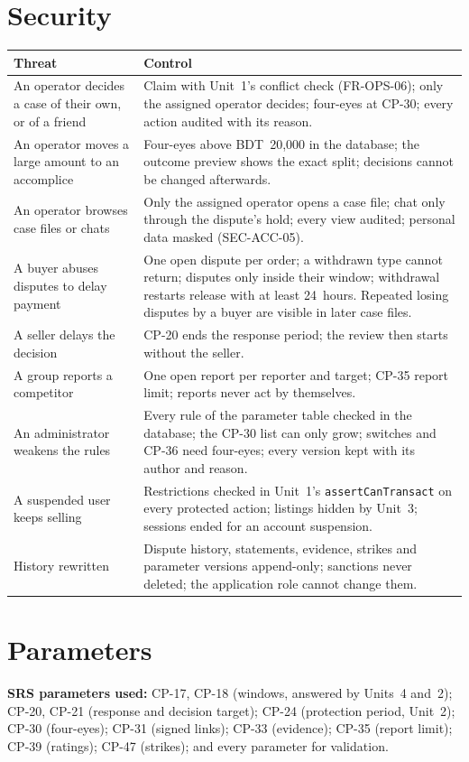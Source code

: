 \documentclass[11pt,a4paper]{article}
\newenvironment{dtable}[1]{\small\begin{longtable}{#1}}{\end{longtable}}
\begin{document}
\section{Security}
\begin{dtable}{@{}>{\raggedright\arraybackslash}p{4.6cm}>{\raggedright\arraybackslash}p{10.6cm}@{}}
\toprule
\textbf{Threat} & \textbf{Control} \\ \midrule \endhead
An operator decides a case of their own, or of a friend & Claim with Unit~1's conflict check (FR-OPS-06); only the assigned operator decides; four-eyes at CP-30; every action audited with its reason. \\
An operator moves a large amount to an accomplice & Four-eyes above BDT~20{,}000 in the database; the outcome preview shows the exact split; decisions cannot be changed afterwards. \\
An operator browses case files or chats & Only the assigned operator opens a case file; chat only through the dispute's hold; every view audited; personal data masked (SEC-ACC-05). \\
A buyer abuses disputes to delay payment & One open dispute per order; a withdrawn type cannot return; disputes only inside their window; withdrawal restarts release with at least 24~hours. Repeated losing disputes by a buyer are visible in later case files. \\
A seller delays the decision & CP-20 ends the response period; the review then starts without the seller. \\
A group reports a competitor & One open report per reporter and target; CP-35 report limit; reports never act by themselves. \\
An administrator weakens the rules & Every rule of the parameter table checked in the database; the CP-30 list can only grow; switches and CP-36 need four-eyes; every version kept with its author and reason. \\
A suspended user keeps selling & Restrictions checked in Unit~1's \texttt{assertCanTransact} on every protected action; listings hidden by Unit~3; sessions ended for an account suspension. \\
History rewritten & Dispute history, statements, evidence, strikes and parameter versions append-only; sanctions never deleted; the application role cannot change them. \\
\bottomrule
\end{dtable}

\section{Parameters}
\textbf{SRS parameters used:} CP-17, CP-18 (windows, answered by Units~4 and~2); CP-20, CP-21 (response and decision target); CP-24 (protection period, Unit~2); CP-30 (four-eyes); CP-31 (signed links); CP-33 (evidence); CP-35 (report limit); CP-39 (ratings); CP-47 (strikes); and every parameter for validation.
\end{document}
